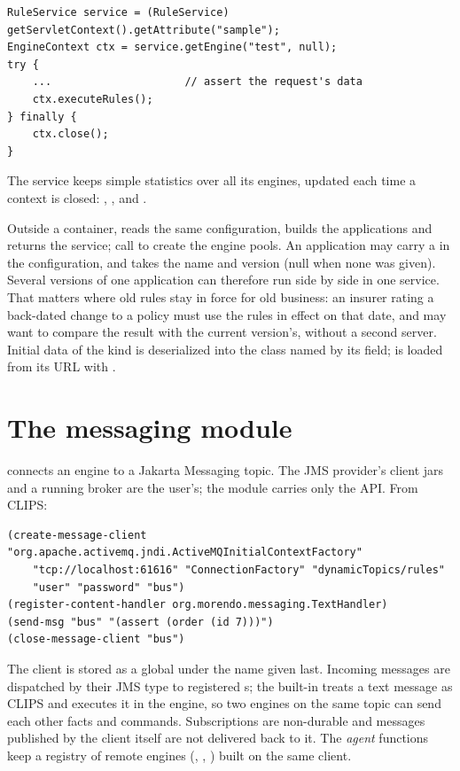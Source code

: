 \begin{lstlisting}[style=java]
RuleService service = (RuleService) getServletContext().getAttribute("sample");
EngineContext ctx = service.getEngine("test", null);
try {
    ...                     // assert the request's data
    ctx.executeRules();
} finally {
    ctx.close();
}
\end{lstlisting}

The service keeps simple statistics over all its engines, updated each
time a context is closed: ,
,  and
.

Outside a container,  reads
the same configuration, builds the applications and returns the service;
call  to create the engine pools. An application may
carry a  in the configuration, and  takes the
name and version (null when none was given). Several versions of one
application can therefore run side by side in one service. That matters
where old rules stay in force for old business: an insurer rating a
back-dated change to a policy must use the rules in effect on that date,
and may want to compare the result with the current version's, without a
second server. Initial data of the
 kind is deserialized into the class named by its
 field;  is loaded from its URL with
.

\section{The messaging module}

 connects an engine to a Jakarta Messaging topic.
The JMS provider's client jars and a running broker are the user's; the
module carries only the API. From CLIPS:

\begin{lstlisting}
(create-message-client "org.apache.activemq.jndi.ActiveMQInitialContextFactory"
    "tcp://localhost:61616" "ConnectionFactory" "dynamicTopics/rules"
    "user" "password" "bus")
(register-content-handler org.morendo.messaging.TextHandler)
(send-msg "bus" "(assert (order (id 7)))")
(close-message-client "bus")
\end{lstlisting}

The client is stored as a global under the name given last. Incoming
messages are dispatched by their JMS type to registered
s; the built-in  treats a text
message as CLIPS and executes it in the engine, so two engines on the
same topic can send each other facts and commands. Subscriptions are
non-durable and messages published by the client itself are not
delivered back to it. The \emph{agent} functions keep a registry of
remote engines (, ,
) built on the same client.
